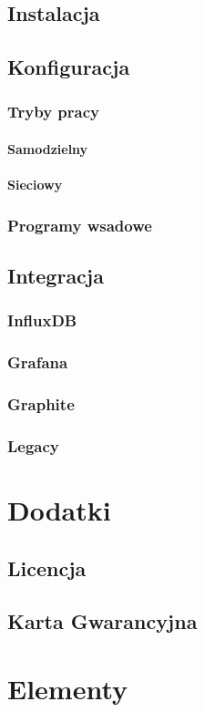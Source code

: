 \documentclass[
12pt, %
a4paper
]{report}
\begin{document}
        \section{Instalacja}
        
        \section{Konfiguracja}
        
            \subsection{Tryby pracy}
            
                \subsubsection{Samodzielny}
                
                \subsubsection{Sieciowy}
                
            \subsection{Programy wsadowe}
            
        \section{Integracja}
        
            \subsection{InfluxDB}
            
            \subsection{Grafana}
            
            \subsection{Graphite}
            
            \subsection{Legacy}
            
    \chapter{Dodatki}
        \section{Licencja}
        
        \section{Karta Gwarancyjna}
        
						
	\chapter{Elementy}
		
		
        
        
        
\end{document}
